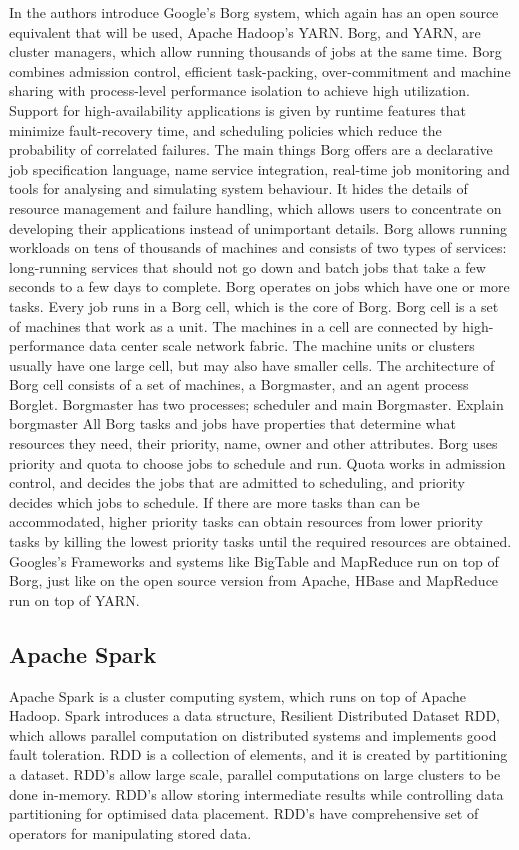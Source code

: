 \documentclass{article}
\theoremstyle{definition}
\begin{document}
In \cite{Verma} the authors introduce Google's Borg system, which again has an open source equivalent that will be used, Apache Hadoop's YARN. Borg, and YARN, are cluster managers, which allow running thousands of jobs at the same time. Borg combines admission control, efficient task-packing, over-commitment and machine sharing with process-level performance isolation to achieve high utilization. Support for high-availability applications is given by runtime features that minimize fault-recovery time, and scheduling policies which reduce the probability of correlated failures. The main things Borg offers are a declarative job specification language, name service integration, real-time job monitoring and tools for analysing and simulating system behaviour. It hides the details of resource management and failure handling, which allows users to concentrate on developing their applications instead of unimportant details. Borg allows running workloads on tens of thousands of machines and consists of two types of services: long-running services that should not go down and batch jobs that take a few seconds to a few days to complete. 
Borg operates on jobs which have one or more tasks. Every job runs in a Borg cell, which is the core of Borg. Borg cell is a set of machines that work as a unit. The machines in a cell are connected by high-performance data center scale network fabric. The machine units or clusters usually have one large cell, but may also have smaller cells. The architecture of Borg cell consists of a set of machines, a Borgmaster, and an agent process Borglet. Borgmaster has two processes; scheduler and main Borgmaster.  Explain borgmaster
All Borg tasks and jobs have properties that determine what resources they need, their priority, name, owner and other attributes. 
Borg uses priority and quota to choose jobs to schedule and run. Quota works in admission control, and decides the jobs that are admitted to scheduling, and priority decides which jobs to schedule. If there are more tasks than can be accommodated, higher priority tasks can obtain resources from lower priority tasks by killing the lowest priority tasks until the required resources are obtained. 
Googles's Frameworks and systems like BigTable and MapReduce run on top of Borg, just like on the open source version from Apache, HBase and MapReduce run on top of YARN. \\


\subsection{Apache Spark}
Apache Spark \cite{Zaharia2012} is a cluster computing system, which runs on top of Apache Hadoop. Spark introduces a data structure, Resilient Distributed Dataset RDD, which allows parallel computation on distributed systems and implements good fault toleration. RDD is a collection of elements, and it is created by partitioning a dataset. RDD's allow large scale, parallel computations on large clusters to be done in-memory. RDD's allow storing intermediate results while controlling data partitioning for optimised data placement. RDD's have comprehensive set of operators for manipulating stored data. \\
\end{document}
